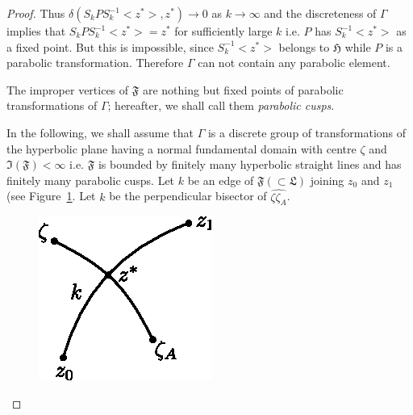 \begin{proof}
Thus $\delta (S_k P S^{-1}_k <z^{\ast}>, z^{\ast}) \to 0$ as $k \to
\infty$ and the discreteness of $\Gamma$ implies that $S_k P S^{-1}_k
<z^{\ast}>=z^{\ast}$ for sufficiently large $k$ i.e. $P$ has
$S^{-1}_k<z^{\ast}>$ as a fixed point. But this is impossible, since
$S^{-1}_k <z^{\ast}>$ belongs to $\mathfrak{H}$ while $P$ is a
parabolic transformation. Therefore $\Gamma$ can not contain any
parabolic element.

The improper vertices of $\mathfrak{F}$ are nothing but fixed points
of parabolic transformations of $\Gamma$; hereafter, we shall call
them \textit{parabolic cusps}.

In the following, we shall assume that $\Gamma$ is a discrete group of
transformations of the hyperbolic plane having a normal fundamental
domain with centre $\zeta$ and $\mathfrak{I}(\mathfrak{F}) < \infty$
i.e. $\mathfrak{F}$ is bounded by finitely many hyperbolic straight
lines and has finitely many parabolic cusps. Let $k$ be an edge of
$\mathfrak{F}(\subset\mathfrak{L})$ joining $z_0$ and $z_1$ 
(see Figure~\ref{chap1:fig10}. Let $k$ be the perpendicular bisector of
$\widehat{\zeta\zeta_A}$.

\begin{figure}[H]
\centering
\includegraphics{vol29-fig/fig29-10.eps}
\smallskip
\caption{}
\label{chap1:fig10}
\end{figure}


\end{proof}
